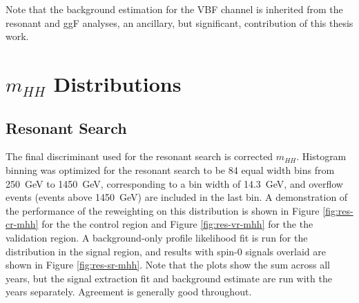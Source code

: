 Note that the background estimation for the VBF channel is inherited from the resonant 
and ggF analyses, an ancillary, but significant, contribution of this thesis work.

\section{$m_{HH}$ Distributions}
\subsection{Resonant Search}
The final discriminant used for the resonant search is corrected $m_{HH}$. Histogram binning was 
optimized for the resonant search to be 84 equal width bins from \SI{250}{\GeV} to \SI{1450}{\GeV}, 
corresponding to a bin width of \SI{14.3}{\GeV}, and overflow events (events above \SI{1450}{\GeV}) 
are included in the last bin. A demonstration of the performance of the reweighting on this 
distribution is shown in Figure \ref{fig:res-cr-mhh} for the the control region and Figure \ref{fig:res-vr-mhh} for 
the the validation region. A background-only profile likelihood fit is run for the distribution in the signal 
region, and results with spin-0 signals overlaid are shown in Figure \ref{fig:res-sr-mhh}. Note that 
the plots show the sum across all years, but the signal extraction fit and background estimate are run with the 
years separately. Agreement is generally good throughout.

